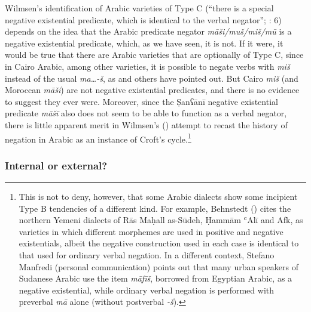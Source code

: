 \documentclass[output=paper]{langsci/langscibook}
\begin{document}
Wilmsen’s identification of Arabic varieties of Type C (“there is a special negative existential predicate, which is identical to the verbal negator”; \citealt{Croft1991}: 6) depends on the idea that the Arabic predicate negator \textit{māši/muš/miš/mū} is a negative existential predicate, which, as we have seen, it is not. If it were, it would be true that there are Arabic varieties that are optionally of Type C, since in Cairo Arabic, among other varieties, it is possible to negate verbs with \textit{miš} instead of the usual \textit{ma…-š}, as \citet{Mughazy2003} and others have pointed out. But Cairo \textit{miš} (and Moroccan \textit{māši}) are not negative existential predicates, and there is no evidence to suggest they ever were. Moreover, since the Ṣanʕānī negative existential predicate \textit{māšī} also does not seem to be able to function as a verbal negator, there is little apparent merit in Wilmsen's (\citeyear{Wilmsen2014}) attempt to recast the history of negation in Arabic as an instance of Croft’s cycle.\footnote{This is not to deny, however, that some Arabic dialects show some incipient Type B tendencies of a different kind. For example, Behnstedt (\citeyear[347]{Behnstedt2016Yemen}) cites the northern Yemeni dialects of Rās Maḥall as-Sūdeh, Ḥammām ʿAlī and Afk, as varieties in which different morphemes are used in positive and negative existentials, albeit the negative construction used in each case is identical to that used for ordinary verbal negation. In a different context, Stefano Manfredi (personal communication) points out that many urban speakers of Sudanese Arabic use the item \textit{māfīš}, borrowed from Egyptian Arabic, as a negative existential, while ordinary verbal negation is performed with preverbal \textit{mā} alone (without postverbal \textit{{}-š}).} 
\largerpage



\subsubsection{Internal or external?}
\end{document}
